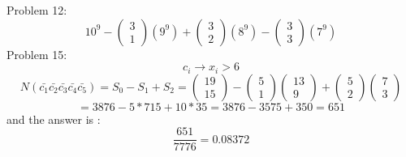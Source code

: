 \documentclass{article}
\begin{document}
Problem 12:
$$
10^9
-
\left(\begin{array}{c}
3\\
1
\end{array}\right)
(9^9)
+
\left(\begin{array}{c}
3\\
2
\end{array}\right)
(8^9)
-
\left(\begin{array}{c}
3\\
3
\end{array}\right)
(7^9)
$$
Problem 15:
$$
c_i \rightarrow x_i>6
$$
$$
N(\bar{c_1}\bar{c_2}\bar{c_3}\bar{c_4}\bar{c_5})=S_0-S_1+S_2
=
\left(\begin{array}{c}
19\\
15
\end{array}\right)
-
\left(\begin{array}{c}
5\\
1
\end{array}\right)
\left(\begin{array}{c}
13\\
9
\end{array}\right)
+
\left(\begin{array}{c}
5\\
2
\end{array}\right)
\left(\begin{array}{c}
7\\
3
\end{array}\right)
$$
$$
=3876-5*715+10*35
=3876-3575+350=651
$$
and the answer is :
$$
\frac{651}{7776}
=
0.08372
$$
\end{document}

